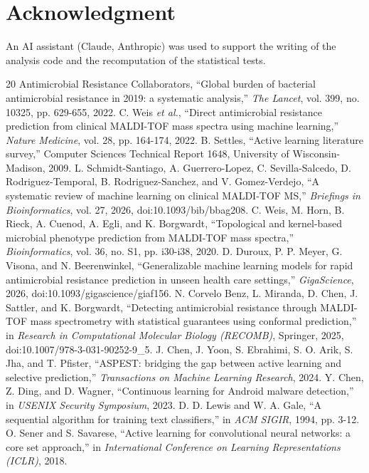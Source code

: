 \documentclass[conference,a4paper]{IEEEtran}
\begin{document}
\section*{Acknowledgment}
An AI assistant (Claude, Anthropic) was used to support the writing of the analysis code and the
recomputation of the statistical tests.

\begin{thebibliography}{20}
 Antimicrobial Resistance Collaborators, ``Global burden of bacterial antimicrobial resistance in 2019: a systematic analysis,'' \textit{The Lancet}, vol. 399, no. 10325, pp. 629-655, 2022.
 C. Weis \textit{et al.}, ``Direct antimicrobial resistance prediction from clinical MALDI-TOF mass spectra using machine learning,'' \textit{Nature Medicine}, vol. 28, pp. 164-174, 2022.
 B. Settles, ``Active learning literature survey,'' Computer Sciences Technical Report 1648, University of Wisconsin-Madison, 2009.
 L. Schmidt-Santiago, A. Guerrero-Lopez, C. Sevilla-Salcedo, D. Rodriguez-Temporal, B. Rodriguez-Sanchez, and V. Gomez-Verdejo, ``A systematic review of machine learning on clinical MALDI-TOF MS,'' \textit{Briefings in Bioinformatics}, vol. 27, 2026, doi:10.1093/bib/bbag208.
 C. Weis, M. Horn, B. Rieck, A. Cuenod, A. Egli, and K. Borgwardt, ``Topological and kernel-based microbial phenotype prediction from MALDI-TOF mass spectra,'' \textit{Bioinformatics}, vol. 36, no. S1, pp. i30-i38, 2020.
 D. Duroux, P. P. Meyer, G. Visona, and N. Beerenwinkel, ``Generalizable machine learning models for rapid antimicrobial resistance prediction in unseen health care settings,'' \textit{GigaScience}, 2026, doi:10.1093/gigascience/giaf156.
 N. Corvelo Benz, L. Miranda, D. Chen, J. Sattler, and K. Borgwardt, ``Detecting antimicrobial resistance through MALDI-TOF mass spectrometry with statistical guarantees using conformal prediction,'' in \textit{Research in Computational Molecular Biology (RECOMB)}, Springer, 2025, doi:10.1007/978-3-031-90252-9\_5.
 J. Chen, J. Yoon, S. Ebrahimi, S. O. Arik, S. Jha, and T. Pfister, ``ASPEST: bridging the gap between active learning and selective prediction,'' \textit{Transactions on Machine Learning Research}, 2024.
 Y. Chen, Z. Ding, and D. Wagner, ``Continuous learning for Android malware detection,'' in \textit{USENIX Security Symposium}, 2023.
 D. D. Lewis and W. A. Gale, ``A sequential algorithm for training text classifiers,'' in \textit{ACM SIGIR}, 1994, pp. 3-12.
 O. Sener and S. Savarese, ``Active learning for convolutional neural networks: a core set approach,'' in \textit{International Conference on Learning Representations (ICLR)}, 2018.

\end{thebibliography}
\end{document}

